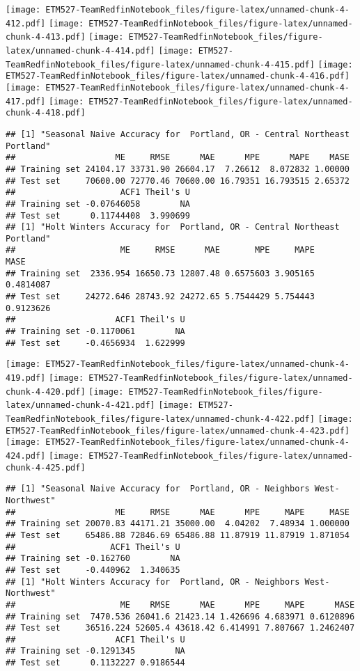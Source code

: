 \documentclass[]{article}
\begin{document}
\texttt{[image: ETM527-TeamRedfinNotebook\_files/figure-latex/unnamed-chunk-4-412.pdf]}
\texttt{[image: ETM527-TeamRedfinNotebook\_files/figure-latex/unnamed-chunk-4-413.pdf]}
\texttt{[image: ETM527-TeamRedfinNotebook\_files/figure-latex/unnamed-chunk-4-414.pdf]}
\texttt{[image: ETM527-TeamRedfinNotebook\_files/figure-latex/unnamed-chunk-4-415.pdf]}
\texttt{[image: ETM527-TeamRedfinNotebook\_files/figure-latex/unnamed-chunk-4-416.pdf]}
\texttt{[image: ETM527-TeamRedfinNotebook\_files/figure-latex/unnamed-chunk-4-417.pdf]}
\texttt{[image: ETM527-TeamRedfinNotebook\_files/figure-latex/unnamed-chunk-4-418.pdf]}

\begin{verbatim}
## [1] "Seasonal Naive Accuracy for  Portland, OR - Central Northeast Portland"
##                    ME     RMSE      MAE      MPE      MAPE    MASE
## Training set 24104.17 33731.90 26604.17  7.26612  8.072832 1.00000
## Test set     70600.00 72770.46 70600.00 16.79351 16.793515 2.65372
##                     ACF1 Theil's U
## Training set -0.07646058        NA
## Test set      0.11744408  3.990699
## [1] "Holt Winters Accuracy for  Portland, OR - Central Northeast Portland"
##                     ME     RMSE      MAE       MPE     MAPE      MASE
## Training set  2336.954 16650.73 12807.48 0.6575603 3.905165 0.4814087
## Test set     24272.646 28743.92 24272.65 5.7544429 5.754443 0.9123626
##                    ACF1 Theil's U
## Training set -0.1170061        NA
## Test set     -0.4656934  1.622999
\end{verbatim}

\texttt{[image: ETM527-TeamRedfinNotebook\_files/figure-latex/unnamed-chunk-4-419.pdf]}
\texttt{[image: ETM527-TeamRedfinNotebook\_files/figure-latex/unnamed-chunk-4-420.pdf]}
\texttt{[image: ETM527-TeamRedfinNotebook\_files/figure-latex/unnamed-chunk-4-421.pdf]}
\texttt{[image: ETM527-TeamRedfinNotebook\_files/figure-latex/unnamed-chunk-4-422.pdf]}
\texttt{[image: ETM527-TeamRedfinNotebook\_files/figure-latex/unnamed-chunk-4-423.pdf]}
\texttt{[image: ETM527-TeamRedfinNotebook\_files/figure-latex/unnamed-chunk-4-424.pdf]}
\texttt{[image: ETM527-TeamRedfinNotebook\_files/figure-latex/unnamed-chunk-4-425.pdf]}

\begin{verbatim}
## [1] "Seasonal Naive Accuracy for  Portland, OR - Neighbors West-Northwest"
##                    ME     RMSE      MAE      MPE     MAPE     MASE
## Training set 20070.83 44171.21 35000.00  4.04202  7.48934 1.000000
## Test set     65486.88 72846.69 65486.88 11.87919 11.87919 1.871054
##                   ACF1 Theil's U
## Training set -0.162760        NA
## Test set     -0.440962  1.340635
## [1] "Holt Winters Accuracy for  Portland, OR - Neighbors West-Northwest"
##                     ME    RMSE      MAE      MPE     MAPE      MASE
## Training set  7470.536 26041.6 21423.14 1.426696 4.683971 0.6120896
## Test set     36516.224 52605.4 43618.42 6.414991 7.807667 1.2462407
##                    ACF1 Theil's U
## Training set -0.1291345        NA
## Test set      0.1132227 0.9186544
\end{verbatim}
\end{document}
